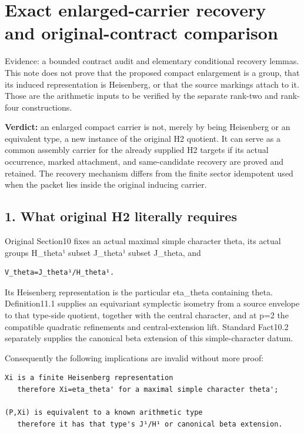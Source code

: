 \clearpage
\section{Exact enlarged-carrier recovery and original-contract comparison}\label{app:lowrank_contract}

Evidence: a bounded contract audit and elementary conditional recovery
lemmas. This note does not prove that the proposed compact enlargement
is a group, that its induced representation is Heisenberg, or that the
source markings attach to it. Those are the arithmetic inputs to be
verified by the separate rank-two and rank-four constructions.

\textbf{Verdict:} an enlarged compact carrier is not, merely by being
Heisenberg or an equivalent type, a new instance of the original H2
quotient. It can serve as a common assembly carrier for the already
supplied H2 targets if its actual occurrence, marked attachment, and
same-candidate recovery are proved and retained. The recovery mechanism
differs from the finite sector idempotent used when the packet lies
inside the original inducing carrier.

\hypertarget{lowrank_contract-what-original-h2-literally-requires}{%
\subsection{1. What original H2 literally
requires}\label{lowrank_contract-what-original-h2-literally-requires}}

Original Section10 fixes an actual maximal simple character theta, its
actual groups H\_theta¹ subset J\_theta¹ subset J\_theta, and

\begin{Verbatim}[fontsize=\small,breaklines=true,breakanywhere=true]
V_theta=J_theta¹/H_theta¹.
\end{Verbatim}

Its Heisenberg representation is the particular eta\_theta containing
theta. Definition11.1 supplies an equivariant symplectic isometry from a
source envelope to that type-side quotient, together with the central
character, and at p=2 the compatible quadratic refinements and
central-extension lift. Standard Fact10.2 separately supplies the
canonical beta extension of this simple-character datum.

Consequently the following implications are invalid without more proof:

\begin{Verbatim}[fontsize=\small,breaklines=true,breakanywhere=true]
Xi is a finite Heisenberg representation
   therefore Xi=eta_theta' for a maximal simple character theta';

(P,Xi) is equivalent to a known arithmetic type
   therefore it has that type's J¹/H¹ or canonical beta extension.
\end{Verbatim}

